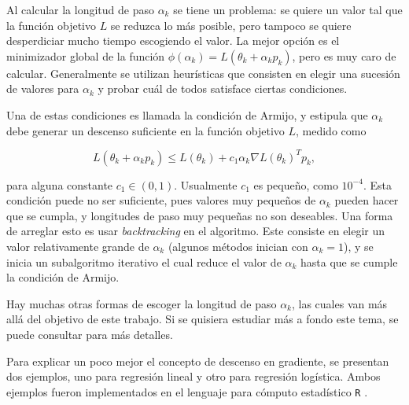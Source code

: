 


Al calcular la longitud de paso $\alpha_k$ se tiene un problema: se quiere un valor tal que la función objetivo $L$ se reduzca lo más posible, pero tampoco se quiere desperdiciar mucho tiempo escogiendo el valor. La mejor opción es el minimizador global de la función $\phi(\alpha_k) = L(\theta_k + \alpha_k p_k)$, pero es muy caro de calcular. Generalmente se utilizan heurísticas que consisten en elegir una sucesión de valores para $\alpha_k$ y probar cuál de todos satisface ciertas condiciones.

Una de estas condiciones es llamada la condición de Armijo, y estipula que $\alpha_k$ debe generar un descenso suficiente en la función objetivo $L$, medido como

$$
  L(\theta_k + \alpha_k p_k) \leq L(\theta_k) + c_1 \alpha_k \nabla L(\theta_k)^T p_k,
$$

para alguna constante $c_1 \in (0, 1)$. Usualmente $c_1$ es pequeño, como $10^{-4}$. Esta condición puede no ser suficiente, pues valores muy pequeños de $\alpha_k$ pueden hacer que se cumpla, y longitudes de paso muy pequeñas no son deseables. Una forma de arreglar esto es usar \textit{backtracking} en el algoritmo. Este consiste en elegir un valor relativamente grande de $\alpha_k$ (algunos métodos inician con $\alpha_k = 1$), y se inicia un subalgoritmo iterativo el cual reduce el valor de $\alpha_k$ hasta que se cumple la condición de Armijo.

Hay muchas otras formas de escoger la longitud de paso $\alpha_k$, las cuales van más allá del objetivo de este trabajo. Si se quisiera estudiar más a fondo este tema, se puede consultar \cite{nocedal2006numerical} para más detalles.

Para explicar un poco mejor el concepto de descenso en gradiente, se presentan dos ejemplos, uno para regresión lineal y otro para regresión logística. Ambos ejemplos fueron implementados en el lenguaje para cómputo estadístico \texttt{R} \cite{R_manual}.


